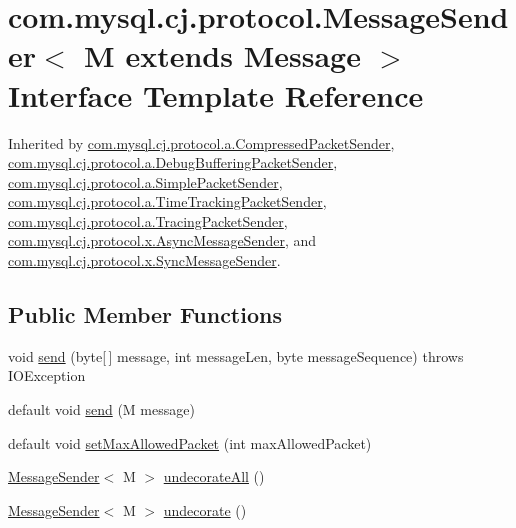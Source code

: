 \hypertarget{interfacecom_1_1mysql_1_1cj_1_1protocol_1_1_message_sender}{}\section{com.\+mysql.\+cj.\+protocol.\+Message\+Sender$<$ M extends Message $>$ Interface Template Reference}
\label{interfacecom_1_1mysql_1_1cj_1_1protocol_1_1_message_sender}


Inherited by \mbox{\hyperlink{classcom_1_1mysql_1_1cj_1_1protocol_1_1a_1_1_compressed_packet_sender}{com.\+mysql.\+cj.\+protocol.\+a.\+Compressed\+Packet\+Sender}}, \mbox{\hyperlink{classcom_1_1mysql_1_1cj_1_1protocol_1_1a_1_1_debug_buffering_packet_sender}{com.\+mysql.\+cj.\+protocol.\+a.\+Debug\+Buffering\+Packet\+Sender}}, \mbox{\hyperlink{classcom_1_1mysql_1_1cj_1_1protocol_1_1a_1_1_simple_packet_sender}{com.\+mysql.\+cj.\+protocol.\+a.\+Simple\+Packet\+Sender}}, \mbox{\hyperlink{classcom_1_1mysql_1_1cj_1_1protocol_1_1a_1_1_time_tracking_packet_sender}{com.\+mysql.\+cj.\+protocol.\+a.\+Time\+Tracking\+Packet\+Sender}}, \mbox{\hyperlink{classcom_1_1mysql_1_1cj_1_1protocol_1_1a_1_1_tracing_packet_sender}{com.\+mysql.\+cj.\+protocol.\+a.\+Tracing\+Packet\+Sender}}, \mbox{\hyperlink{classcom_1_1mysql_1_1cj_1_1protocol_1_1x_1_1_async_message_sender}{com.\+mysql.\+cj.\+protocol.\+x.\+Async\+Message\+Sender}}, and \mbox{\hyperlink{classcom_1_1mysql_1_1cj_1_1protocol_1_1x_1_1_sync_message_sender}{com.\+mysql.\+cj.\+protocol.\+x.\+Sync\+Message\+Sender}}.

\subsection*{Public Member Functions}
\begin{DoxyCompactItemize}
\item 
void \mbox{\hyperlink{interfacecom_1_1mysql_1_1cj_1_1protocol_1_1_message_sender_a0c7192449eae4aa0f0dbbc9778dac002}{send}} (byte\mbox{[}$\,$\mbox{]} message, int message\+Len, byte message\+Sequence)  throws I\+O\+Exception
\item 
default void \mbox{\hyperlink{interfacecom_1_1mysql_1_1cj_1_1protocol_1_1_message_sender_a98dcb1def5601d40046a1cf5f9b67db4}{send}} (M message)
\item 
default void \mbox{\hyperlink{interfacecom_1_1mysql_1_1cj_1_1protocol_1_1_message_sender_a31345b7817dcc7e982bb96dba97b3a01}{set\+Max\+Allowed\+Packet}} (int max\+Allowed\+Packet)
\item 
\mbox{\hyperlink{interfacecom_1_1mysql_1_1cj_1_1protocol_1_1_message_sender}{Message\+Sender}}$<$ M $>$ \mbox{\hyperlink{interfacecom_1_1mysql_1_1cj_1_1protocol_1_1_message_sender_a8066931f03c2fa9cc705716fa10a4517}{undecorate\+All}} ()
\item 
\mbox{\hyperlink{interfacecom_1_1mysql_1_1cj_1_1protocol_1_1_message_sender}{Message\+Sender}}$<$ M $>$ \mbox{\hyperlink{interfacecom_1_1mysql_1_1cj_1_1protocol_1_1_message_sender_a3a352bf35ad98dc6cea7c1f4ac9480da}{undecorate}} ()
\end{DoxyCompactItemize}


